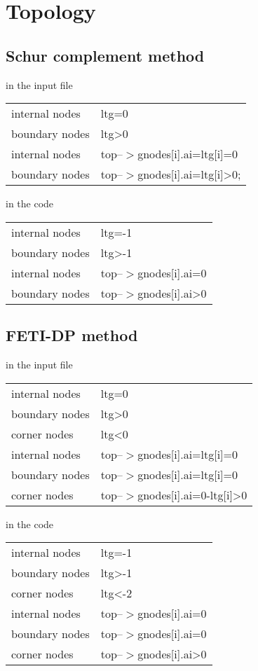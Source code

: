 \chapter{Topology}

\section{Schur complement method}

in the input file
\begin{tabular}{ll}
internal nodes & ltg=0
\\
boundary nodes & ltg>0
\\
internal nodes & top--$>$gnodes[i].ai=ltg[i]=0
\\
boundary nodes & top--$>$gnodes[i].ai=ltg[i]>0;
\end{tabular}


in the code
\begin{tabular}{ll}
internal nodes & ltg=-1
\\
boundary nodes & ltg>-1
\\
internal nodes & top--$>$gnodes[i].ai=0
\\
boundary nodes & top--$>$gnodes[i].ai>0
\end{tabular}

\section{FETI-DP method}

in the input file
\begin{tabular}{ll}
internal nodes & ltg=0
\\
boundary nodes & ltg>0
\\
corner nodes   & ltg<0
\\
internal nodes & top--$>$gnodes[i].ai=ltg[i]=0
\\
boundary nodes & top--$>$gnodes[i].ai=ltg[i]=0
\\
corner nodes   & top--$>$gnodes[i].ai=0-ltg[i]>0
\end{tabular}


in the code
\begin{tabular}{ll}
internal nodes & ltg=-1
\\
boundary nodes & ltg>-1
\\
corner nodes   & ltg<-2
\\
internal nodes & top--$>$gnodes[i].ai=0
\\
boundary nodes & top--$>$gnodes[i].ai=0
\\
corner nodes   & top--$>$gnodes[i].ai>0
\end{tabular}

